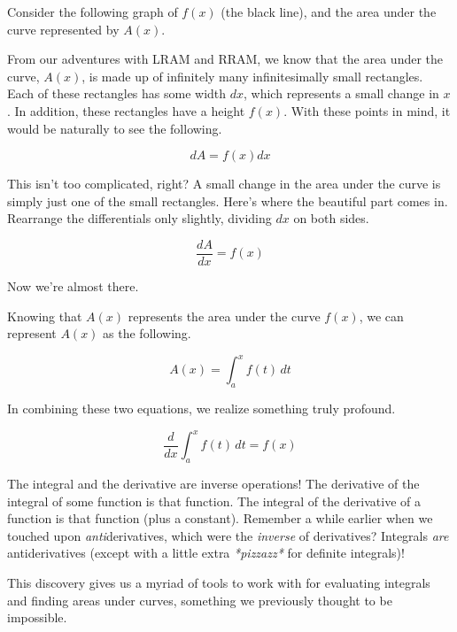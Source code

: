 Consider the following graph of \( f \left( x \right) \) (the black line), and the area under the curve represented by \( A \left( x \right) \). 

\begin{figure}[H]
    \centering
    
\end{figure}

From our adventures with LRAM and RRAM, we know that the area under the curve, \( A \left( x \right) \), is made up of infinitely many infinitesimally small rectangles. Each of these rectangles has some width \( dx \), which represents a small change in \( x \). In addition, these rectangles have a height \( f \left( x \right) \). With these points in mind, it would be naturally to see the following.

\[
    dA = f \left( x \right) dx
\]

This isn't too complicated, right? A small change in the area under the curve is simply just one of the small rectangles. Here's where the beautiful part comes in. Rearrange the differentials only slightly, dividing \( dx \) on both sides.

\[
    \frac{dA}{dx} = f \left( x \right)
\]

Now we're almost there.

Knowing that \( A \left( x \right) \) represents the area under the curve \( f \left( x \right) \), we can represent \( A \left( x \right) \) as the following.

\[
    A \left( x \right) = \int_{ a }^{ x } f \left( t \right) \, dt
\]

In combining these two equations, we realize something truly profound.

\[
    \frac{d}{dx} \int_{ a }^{ x } f \left( t \right) \, dt = f \left( x \right)
\]

The integral and the derivative are inverse operations! The derivative of the integral of some function is that function. The integral of the derivative of a function is that function (plus a constant). Remember a while earlier when we touched upon \textit{anti}derivatives, which were the \textit{inverse} of derivatives? Integrals \textit{are} antiderivatives (except with a little extra \textit{*pizzazz*} for definite integrals)!

This discovery gives us a myriad of tools to work with for evaluating integrals and finding areas under curves, something we previously thought to be impossible.

